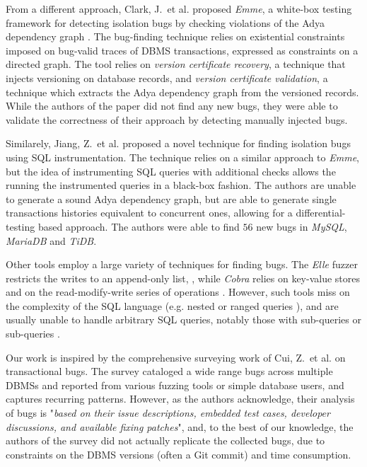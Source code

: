 From a different approach, Clark, J.\ et al. \cite{clark2024validating} proposed \textit{Emme}, a white-box testing framework for detecting isolation bugs by checking violations of the Adya dependency graph \cite{adya1999weak}. The bug-finding technique relies on existential constraints imposed on bug-valid traces of DBMS transactions, expressed as constraints on a directed graph. The tool relies on \textit{version certificate recovery}, a technique that injects versioning on database records, and \textit{version certificate validation}, a technique which extracts the Adya dependency graph from the versioned records. While the authors of the paper did not find any new bugs, they were able to validate the correctness of their approach by detecting manually injected bugs.

Similarely, Jiang, Z.\ et al. \cite{jiang2023detecting} proposed a novel technique for finding isolation bugs using SQL instrumentation. The technique relies on a similar approach to \textit{Emme}, but the idea of instrumenting SQL queries with additional checks allows the running the instrumented queries in a black-box fashion. The authors are unable to generate a sound Adya dependency graph, but are able to generate single transactions histories equivalent to concurrent ones, allowing for a differential-testing based approach. The authors were able to find $56$ new bugs in \textit{MySQL}, \textit{MariaDB} and \textit{TiDB}.

Other tools employ a large variety of techniques for finding bugs. The \textit{Elle} fuzzer restricts the writes to an append-only list, \cite{kingsbury2020elle}, while \textit{Cobra} relies on key-value stores and on the read-modify-write series of operations \cite{tan2020cobra}. However, such tools miss on the complexity of the SQL language (e.g. nested or ranged queries \cite{jiang2023dynsql}), and are usually unable to handle arbitrary SQL queries, notably those with sub-queries or sub-queries \cite{levy1994query}.

Our work is inspired by the comprehensive surveying work of Cui, Z.\ et al. \cite{cui2024understanding_ICSE2024} on transactional bugs. The survey cataloged a wide range bugs across multiple DBMSs and reported from various fuzzing tools or simple database users, and captures recurring patterns. However, as the authors acknowledge, their analysis of bugs is "\textit{based on their issue descriptions, embedded test cases, developer discussions, and available fixing patches}", and, to the best of our knowledge, the authors of the survey did not actually replicate the collected bugs, due to constraints on the DBMS versions (often a Git commit) and time consumption.

